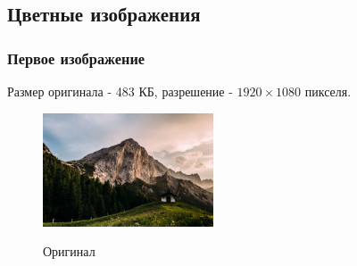 \documentclass[a4paper]{article}
\begin{document}
\subsection{Цветные изображения}
\subsubsection{Первое изображение}
Размер оригинала - 483 КБ, разрешение - $1920\times 1080$ пикселя.
\begin{figure}[H]
\centering
\caption{Оригинал}
    \includegraphics[width = 0.45\textwidth]{resources/Austria.jpg}
    \label{fig:aus_orig}
\end{figure}
\end{document}
